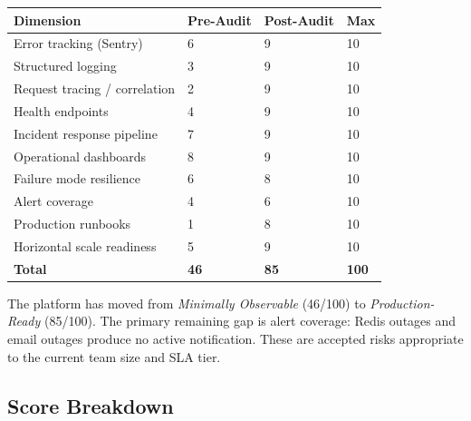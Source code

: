 \documentclass[12pt,a4paper]{article}
\begin{document}
\begin{center}
\begin{tabular}{p{5.5cm}p{2.5cm}p{2.5cm}p{3cm}}
\toprule
\rowcolor{tableheadbg}
\textbf{\color{white}Dimension} & \textbf{\color{white}Pre-Audit} & \textbf{\color{white}Post-Audit} & \textbf{\color{white}Max} \\
\midrule
Error tracking (Sentry)         & 6  & 9  & 10 \\
Structured logging              & 3  & 9  & 10 \\
Request tracing / correlation   & 2  & 9  & 10 \\
Health endpoints                & 4  & 9  & 10 \\
Incident response pipeline      & 7  & 9  & 10 \\
Operational dashboards          & 8  & 9  & 10 \\
Failure mode resilience         & 6  & 8  & 10 \\
Alert coverage                  & 4  & 6  & 10 \\
Production runbooks             & 1  & 8  & 10 \\
Horizontal scale readiness      & 5  & 9  & 10 \\
\midrule
\textbf{Total}                  & \textbf{46} & \textbf{85} & \textbf{100} \\
\bottomrule
\end{tabular}
\end{center}

\vspace{1em}

\begin{tcolorbox}[colback=ok!10,colframe=ok,title=\textbf{Post-Audit Rating: Production-Ready (85/100)}]
The platform has moved from \textit{Minimally Observable} (46/100) to
\textit{Production-Ready} (85/100).  The primary remaining gap is alert
coverage: Redis outages and email outages produce no active notification.
These are accepted risks appropriate to the current team size and SLA tier.
\end{tcolorbox}

\subsection{Score Breakdown}
\end{document}
